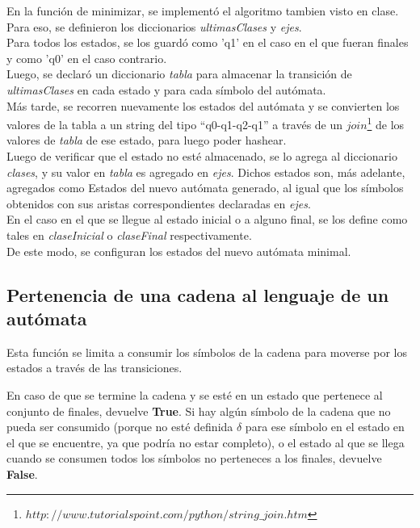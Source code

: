 \documentclass[a4paper, 10pt, twoside]{article}
\begin{document}
En la función de minimizar, se implementó el algoritmo tambien visto en clase. Para eso, se definieron los diccionarios \textit{ultimasClases} y \textit{ejes}.\\
\newline
Para todos los estados, se los guardó como 'q1' en el caso en el que fueran finales y como 'q0' en el caso contrario.\\
Luego, se declaró un diccionario \textit{tabla} para almacenar la transición de \textit{ultimasClases} en cada estado y para cada símbolo del autómata.\\
\newline
Más tarde, se recorren nuevamente los estados del autómata y se convierten los valores de la tabla a un string del tipo ``q0-q1-q2-q1'' a través de un $join$\footnote{$http://www.tutorialspoint.com/python/string\_join.htm$} de los valores de \textit{tabla} de ese estado, para luego poder hashear.\\
\newline
Luego de verificar que el estado no esté almacenado, se lo agrega al diccionario \textit{clases}, y su valor en \textit{tabla} es agregado en \textit{ejes}. Dichos estados son, más adelante, agregados como Estados del nuevo autómata generado, al igual que los símbolos obtenidos con sus aristas correspondientes declaradas en \textit{ejes}.\\
\newline
En el caso en el que se llegue al estado inicial o a alguno final, se los define como tales en \textit{claseInicial} o \textit{claseFinal} respectivamente.\\
\newline
De este modo, se configuran los estados del nuevo autómata minimal.


\subsection{Pertenencia de una cadena al lenguaje de un autómata}

Esta función se limita a consumir los símbolos de la cadena para moverse por los estados a través de las transiciones.

En caso de que se termine la cadena y se esté en un estado que pertenece al conjunto de finales, devuelve \textbf{True}. Si hay algún símbolo de la cadena que no pueda ser consumido (porque no esté definida $\delta$ para ese símbolo en el estado en el que se encuentre, ya que podría no estar completo), o el estado al que se llega cuando se consumen todos los símbolos no perteneces a los finales, devuelve \textbf{False}.
\end{document}
